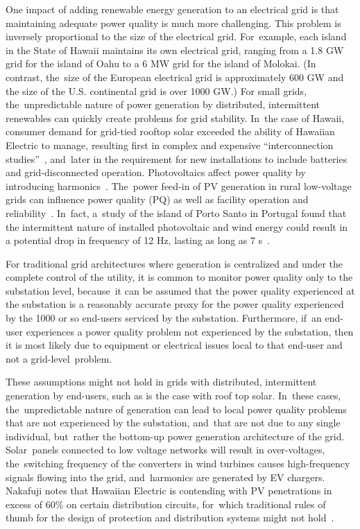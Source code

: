 \documentclass[energies,article,accept,moreauthors,pdftex]{Definitions/mdpi}
\begin{document}
One impact of adding renewable energy generation to an electrical grid is that maintaining adequate power quality is much more challenging. This problem is inversely proportional to the size of the electrical grid. For~example, each island in the State of Hawaii maintains its own electrical grid, ranging from a 1.8 GW grid for the island of Oahu to a 6 MW grid for the island of Molokai. (In contrast, the~size of the European electrical grid is approximately 600 GW and the size of the U.S. continental grid is over 1000 GW.) For small grids, the~unpredictable nature of power generation by distributed, intermittent renewables can quickly create problems for grid stability. In~the case of Hawaii, consumer demand for grid-tied rooftop solar exceeded the ability of Hawaiian Electric to manage, resulting first in complex and expensive ``interconnection studies''~\cite{trabish_solar_2014,anastasi_energy_2009}, and~later in the requirement for new installations to include batteries and grid-disconnected operation. Photovoltaics affect power quality by introducing harmonics~\cite{anurangi_effects_2017}. The~power feed-in of PV generation in rural low-voltage grids can influence power quality (PQ) as well as facility operation and reliability~\cite{rita_pinto_impact_2016}. In~fact, a~study of the island of Porto Santo in Portugal found that the intermittent nature of installed photovoltaic and wind energy could result in a potential drop in frequency of 12 Hz, lasting as long as 7 s~\cite{delgado_solutions_2011}.

 For traditional grid architectures where generation is centralized and under the complete control of the utility, it is common to monitor power quality only to the substation level, because~it can be assumed that the power quality experienced at the substation is a reasonably accurate proxy for the power quality experienced by the 1000 or so end-users serviced by the substation. Furthermore, if~an end-user experiences a power quality problem not experienced by the substation, then it is most likely due to equipment or electrical issues local to that end-user and not a grid-level~problem.

These assumptions might not hold in grids with distributed, intermittent generation by end-users, such as is the case with roof top solar. In~these cases, the~unpredictable nature of generation can lead to local power quality problems that are not experienced by the substation, and~that are not due to any single individual, but~rather the bottom-up power generation architecture of the grid. Solar~panels connected to low voltage networks will result in over-voltages, the~switching frequency of the converters in wind turbines causes high-frequency signals flowing into the grid, and~harmonics are generated by EV chargers.~\cite{zavoda_power_2018}
Nakafuji notes that Hawaiian Electric is contending with PV penetrations in excess of 60\% on certain distribution circuits, for~which traditional rules of thumb for the design of protection and distribution systems might not hold~\cite{nakafuji_back--basics_2011}.
\end{document}
